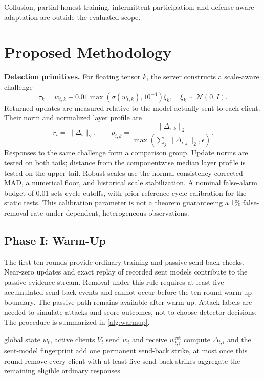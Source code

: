 \documentclass[conference]{IEEEtran}
\begin{document}
Collusion, partial honest training, intermittent participation, and defense-aware adaptation are outside the evaluated scope.


\section{Proposed Methodology}
\noindent\textbf{Detection primitives.}
For floating tensor $k$, the server constructs a scale-aware challenge
\begin{equation}
\tau_k=w_{t,k}+0.01\max(\sigma(w_{t,k}),10^{-4})\xi_k,
\quad \xi_k\sim\mathcal N(0,I).
\end{equation}
Returned updates are measured relative to the model actually sent to each client. Their norm and normalized layer profile are
\begin{equation}
r_i=\|\Delta_i\|_2,\qquad
p_{i,k}=\frac{\|\Delta_{i,k}\|_2}{\max(\sum_j\|\Delta_{i,j}\|_2,\epsilon)}.
\end{equation}
Responses to the same challenge form a comparison group. Update norms are tested on both tails; distance from the componentwise median layer profile is tested on the upper tail. Robust scales use the normal-consistency-corrected MAD, a numerical floor, and historical scale stabilization. A nominal false-alarm budget of 0.01 sets cycle cutoffs, with prior reference-cycle calibration for the static tests. This calibration parameter is not a theorem guaranteeing a 1\% false-removal rate under dependent, heterogeneous observations.

\subsection{Phase I: Warm-Up}
The first ten rounds provide ordinary training and passive send-back checks. Near-zero updates and exact replay of recorded sent models contribute to the passive evidence stream. Removal under this rule requires at least five accumulated send-back events and cannot occur before the ten-round warm-up boundary. The passive path remains available after warm-up. Attack labels are needed to simulate attacks and score outcomes, not to choose detector decisions. The procedure is summarized in \autoref{alg:warmup}.

\begin{algorithm}[t]
\caption{Phase I: warm-up and passive evidence}
\label{alg:warmup}
\begin{algorithmic}[1]
\Require global state $w_t$, active clients $V_t$
 \State send $w_t$ and receive $w^{\mathrm{ret}}_{t,i}$
 \State compute $\Delta_{t,i}$ and the sent-model fingerprint
   \State add one permanent send-back strike, at most once this round
 \EndIf
\EndFor
{}
 \State remove every client with at least five send-back strikes
\EndIf
\State aggregate the remaining eligible ordinary responses
\end{algorithmic}
\end{algorithm}
\end{document}

